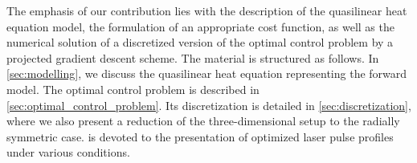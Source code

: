 The emphasis of our contribution lies with the description of the quasilinear heat equation model, the formulation of an appropriate cost function, as well as the numerical solution of a discretized version of the optimal control problem by a projected gradient descent scheme.
The material is structured as follows.
In \cref{sec:modelling}, we discuss the quasilinear heat equation representing the forward model.
The optimal control problem is described in \cref{sec:optimal_control_problem}.
Its discretization is detailed in \cref{sec:discretization}, where we also present a reduction of the three-dimensional setup to the radially symmetric case.
 is devoted to the presentation of optimized laser pulse profiles under various conditions.



